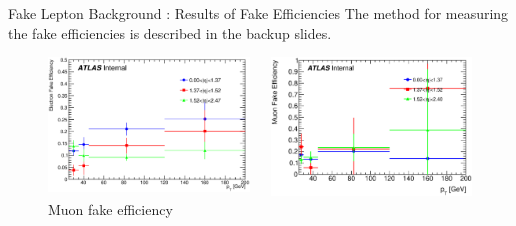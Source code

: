 \documentclass[mathserif,serif]{beamer}
\begin{document}
\begin{frame}{Fake Lepton Background : Results of Fake Efficiencies}
The method for measuring the fake efficiencies is described in the backup slides.
\begin{figure}
\begin{columns}

\begin{column}{0.5\textwidth}
\includegraphics[width=\textwidth]{data/plot/getFakeEffs/El_hEff.eps}
\caption{Electron fake efficiency}
\end{column}

\begin{column}{0.5\textwidth}
\includegraphics[width=\textwidth]{data/plot/getFakeEffs/Mu_hEff.eps}
\caption{Muon fake efficiency}
\end{column}

\end{columns}
\end{figure}
\end{frame}
\end{document}
